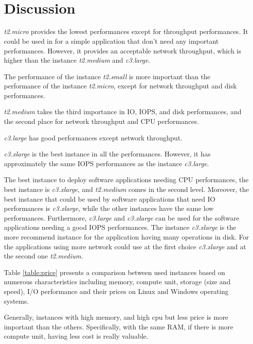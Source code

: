 \documentclass[10pt, conference]{IEEEtran}
\begin{document}
\

\
\nocite{*}

\section{Discussion}
\label{sec:discussion}

\textit{t2.micro} provides the lowest performances except for throughput performances. It could be used in for a simple application that don't need any important performances. However, it provides an acceptable network throughput, which is higher than the instance \textit{t2.medium} and \textit{c3.large}.

The performance of the instance \textit{t2.small} is more important than the performance of the instance \textit{t2.micro}, except for network throughput and disk performances. 

\textit{t2.medium} takes the third importance in IO, IOPS, and disk performances, and the second place for network throughput and CPU performances.

\textit{c3.large} has good performances except network throughput. 

\textit{c3.xlarge} is the best instance in all the performances. However, it has approximately the same IOPS performances as the instance \textit{c3.large}.

The best instance to deploy software applications needing CPU performances, the best instance is \textit{c3.xlarge}, and \textit{t2.medium} comes in the second level. Moreover, the best instance that could be used by software applications that need IO performances is \textit{c3.xlarge}, while the other instances have the same low performances. Furthermore, \textit{c3.large} and \textit{c3.xlarge} can be used for the software applications needing a good IOPS performances. The instance \textit{c3.xlarge} is the more recommend instance for the application having many operations in disk. For the applications using more network could use at the first choice \textit{c3.xlarge} and at the second one \textit{t2.medium}.

Table \ref{table:price} presents a comparison between used instances based on numerous characteristics including memory, compute unit, storage (size and speed), I/O performance and their prices on Linux and Windows operating systems.

Generally, instances with high memory, and high cpu but less price is more important than the others. Specifically, with the same RAM, if there is more compute unit, having less cost is really valuable.
\end{document}

